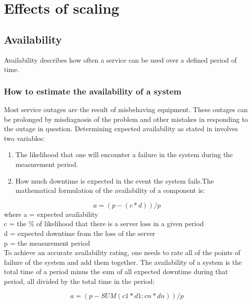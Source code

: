 \chapter{Effects of scaling}
\label{ch:Effects of scaling}

\section{Availability}
Availability describes how often a service can be used over a defined period of time.

\subsection{How to estimate the availability of a system}

Most service outages are the result of misbehaving equipment. These outages can be prolonged by misdiagnosis of the problem and other mistakes in responding to the outage in question. Determining expected availability as stated in \cite{reese_cloud_nodate} involves two variables:

\begin{enumerate}


	\item  The likelihood that one will encounter a failure in the system during the measurement period.

	\item  How much downtime is expected in the event the system fails.The mathematical formulation of the availability of a component is: 
\end{enumerate}
\begin{equation}
a = (p - (c*d))/p
\end{equation}
where a = expected availability\\
c = the \% of likelihood that there is a server loss in a given period\\
d = expected downtime from the loss of the server\\
p = the measurement period\\

To achieve an accurate availability rating, one needs to rate all of the points of failure of the system and add them together. The availability of a system is the total time of a period minus the sum of all expected downtime during that period, all divided by the total time in the period:

\begin{equation}
a = (p - SUM(c1*d1:cn*dn))/p
\end{equation}

